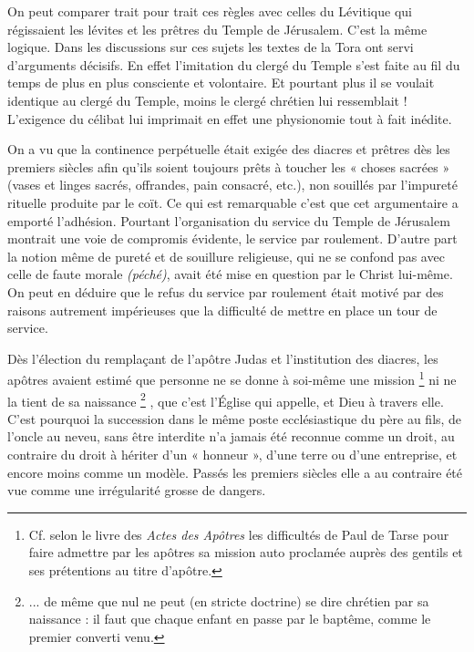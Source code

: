  On peut comparer trait pour trait ces règles avec celles du Lévitique qui régissaient les lévites et les prêtres du Temple de Jérusalem. C'est la même logique. Dans les discussions sur ces sujets les textes de la Tora ont servi d'arguments décisifs. En effet l'imitation du clergé du Temple s'est faite au fil du temps de plus en plus consciente et volontaire. Et pourtant plus il se voulait identique au clergé du Temple, moins le clergé chrétien lui ressemblait ! L'exigence du célibat lui imprimait en effet une physionomie tout à fait inédite. 

 On a vu que la continence perpétuelle était exigée des diacres et prêtres dès les premiers siècles afin qu'ils soient toujours prêts à toucher les « choses sacrées » (vases et linges sacrés, offrandes, pain consacré, etc.), non souillés par l'impureté rituelle produite par le coït. Ce qui est remarquable c'est que cet argumentaire a emporté l'adhésion. Pourtant l'organisation du service du Temple de Jérusalem montrait une voie de compromis évidente, le service par roulement. D'autre part la notion même de pureté et de souillure religieuse, qui ne se confond pas avec celle de faute morale \emph{(péché)}, avait été mise en question par le Christ lui-même. On peut en déduire que le refus du service par roulement était motivé par des raisons autrement impérieuses que la difficulté de mettre en place un tour de service. 

 Dès l'élection du remplaçant de l'apôtre Judas et l'institution des diacres, les apôtres avaient estimé que personne ne se donne à soi-même une mission%
\footnote{Cf. selon le livre des \emph{Actes des Apôtres} les difficultés de Paul de Tarse pour faire admettre par les apôtres sa mission auto proclamée auprès des gentils et ses prétentions au titre d'apôtre.} 
ni ne la tient de sa naissance%
\footnote{... de même que nul ne peut (en stricte doctrine) se dire chrétien par sa naissance : il faut que chaque enfant en passe par le baptême, comme le premier converti venu.}%
, que c'est l'Église qui appelle, et Dieu à travers elle. C'est pourquoi la succession dans le même poste ecclésiastique du père au fils, de l'oncle au neveu, sans être interdite n'a jamais été reconnue comme un droit, au contraire du droit à hériter d'un « honneur », d'une terre ou d'une entreprise, et encore moins comme un modèle. Passés les premiers siècles elle a au contraire été vue comme une irrégularité grosse de dangers. 


